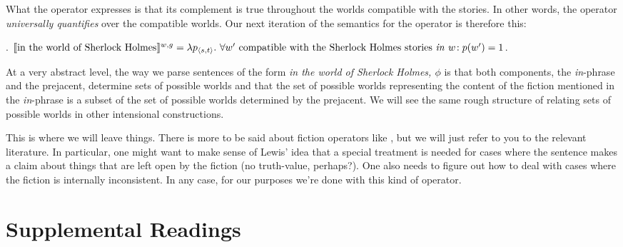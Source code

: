 What the operator 
expresses is that its complement is true throughout the worlds
compatible with the stories. In other words, the operator
\emph{universally quantifies} over the compatible worlds. Our next
iteration of the semantics for the operator is therefore this:

\ex. $\llbracket \mbox{in the world of Sherlock Holmes} \rrbracket^{w,g} =\\
\lambda p_{\langle s,t \rangle}.\ \forall w' \mbox{ compatible with the Sherlock Holmes stories \emph{in} } w\!:\\
p(w') = 1$.

At a very abstract level, the way we parse sentences of the form
\emph{in the world of Sherlock Holmes, $\phi$} is that both
components, the \emph{in}-phrase and the prejacent, determine sets of
possible worlds and that the set of possible worlds representing the
content of the fiction mentioned in the \emph{in}-phrase is a subset
of the set of possible worlds determined by the prejacent. We will see
the same rough structure of relating sets of possible worlds in other
intensional constructions.

This is where we will leave things. There is more to be said about
fiction operators like ,
but we will just refer to you to the relevant literature. In
particular, one might want to make sense of Lewis' idea that a special
treatment is needed for cases where the sentence makes a claim about
things that are left open by the fiction (no truth-value, perhaps?).
One also needs to figure out how to deal with cases where the fiction
is internally inconsistent. In any case, for our purposes we're done
with this kind of operator.

\section{Supplemental Readings}

